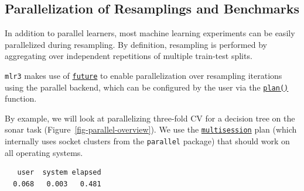 \hypertarget{sec-parallel-resample}{%
\subsection{Parallelization of Resamplings and
Benchmarks}\label{sec-parallel-resample}}

In addition to parallel learners, most machine learning experiments can
be easily parallelized during resampling. By definition, resampling is
performed by aggregating over independent repetitions of multiple
train-test splits.

\texttt{mlr3} makes use of
\href{https://cran.r-project.org/package=future}{\texttt{future}} to
enable parallelization over resampling iterations using the parallel
backend, which can be configured by the user via the
\href{https://www.rdocumentation.org/packages/future/topics/plan}{\texttt{plan()}}
function.

By example, we will look at parallelizing three-fold CV for a decision
tree on the sonar task (Figure~\ref{fig-parallel-overview}). We use the
\href{https://www.rdocumentation.org/packages/future/topics/multisession}{\texttt{multisession}}
plan (which internally uses socket clusters from the \texttt{parallel}
package) that should work on all operating systems.

\begin{Shaded}
\begin{Highlighting}[]

\SpecialCharTok{::}\NormalTok{(}\NormalTok{)}

\OtherTok{=} \NormalTok{(}\NormalTok{)}
\OtherTok{=} \NormalTok{(}\NormalTok{)}
\OtherTok{=} \NormalTok{(}\NormalTok{, } \NormalTok{)}
\NormalTok{(\{}
\end{Highlighting}
\end{Shaded}

\begin{verbatim}
   user  system elapsed 
  0.068   0.003   0.481 
\end{verbatim}

